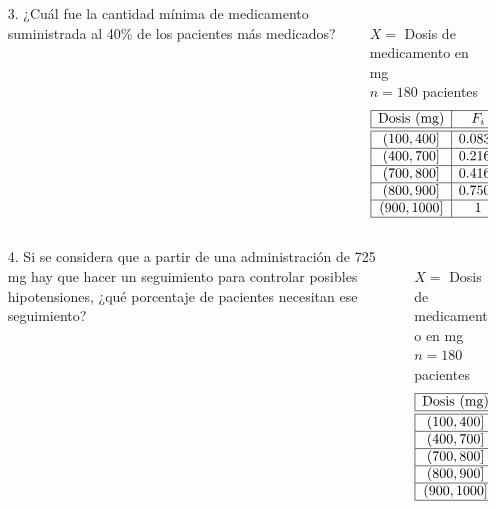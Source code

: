 \documentclass[aspectratio=149,10pt,xcolor=dvipsnames,t]{beamer}
\begin{document}
\begin{frame}
\begin{columns}
\begin{column}[T]{0.65\textwidth}
\begin{enumerate}
\item[3.] ¿Cuál fue la cantidad mínima de medicamento suministrada al 40\% de los pacientes más medicados?
\end{enumerate}
\end{column}
\begin{column}[T]{0.35\textwidth}
\\
$X=$ Dosis de medicamento en mg\\
$n=180$ pacientes\\
\[
\begin{array}{|c|c|}
\hline
\textrm{Dosis (mg)} & F_i\\
\hline\hline
(100,400] & 0.0833 \\
\hline
(400,700] & 0.2167\\
\hline
(700,800] & 0.4167 \\
\hline
(800,900] & 0.7500 \\
\hline
(900,1000] & 1 \\
\hline
\end{array}
\]
\end{column}
\end{columns}
\end{frame}


\begin{frame}
\begin{columns}
\begin{column}[T]{0.65\textwidth}
\begin{enumerate}
\item[4.] Si se considera que a partir de una administración de 725 mg hay que hacer un seguimiento para controlar posibles
hipotensiones, ¿qué porcentaje de pacientes necesitan ese seguimiento?
\end{enumerate}
\end{column}
\begin{column}[T]{0.35\textwidth}
\\
$X=$ Dosis de medicamento en mg\\
$n=180$ pacientes\\
\[
\begin{array}{|c|c|}
\hline
\textrm{Dosis (mg)} & F_i\\
\hline\hline
(100,400] & 0.0833 \\
\hline
(400,700] & 0.2167\\
\hline
(700,800] & 0.4167 \\
\hline
(800,900] & 0.7500 \\
\hline
(900,1000] & 1 \\
\hline
\end{array}
\]
\end{column}
\end{columns}
\end{frame}
\end{document}
